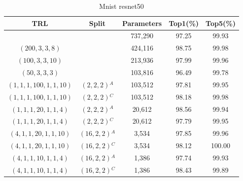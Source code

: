 \documentclass{article}
\begin{document}
	
	
	\begin{table}
		\centering
		\begin{tabular}{c c c c c}
			\hline
			\textbf{TRL} & \textbf{Split} & \textbf{Parameters} & \textbf{Top1(\%)} & \textbf{Top5(\%)} \\
			\hline
			& & 737,290 & 97.25 & 99.93 \\
			$(200,3,3,8)$ & & 424,116 & 98.75 & 99.98 \\
			$(100,3,3,10)$ & & 213,936 & 97.99 & 99.96 \\
			$(50,3,3,3)$ & & 103,816 & 96.49 & 99.78 \\
			$(1,1,1,100,1,1,10)$ & $(2,2,2)$$^A$ & 103,512 & 97.81 & 99.95 \\
			$(1,1,1,100,1,1,10)$ & $(2,2,2)$$^C$ & 103,512 & 98.18 & 99.98 \\
			$(1,1,1,20,1,1,4)$ & $(2,2,2)$$^A$ & 20,612 & 98.56 & 99.94 \\
			$(1,1,1,20,1,1,4)$ & $(2,2,2)$$^C$ & 20,612 & 97.79 & 99.95 \\
			$(4,1,1,20,1,1,10)$ & $(16,2,2)$$^A$ & 3,534 & 97.85 & 99.96 \\
			$(4,1,1,20,1,1,10)$ & $(16,2,2)$$^C$ & 3,534 & 98.12 & 100.00 \\
			$(4,1,1,10,1,1,4)$ & $(16,2,2)$$^A$ & 1,386 & 97.74 & 99.93 \\
			$(4,1,1,10,1,1,4)$ & $(16,2,2)$$^C$ & 1,386 & 98.43 & 99.89 \\
			\hline
		\end{tabular}
		\caption{Mnist resnet50}
		\label{tab: mnist resnet50}
	\end{table}
	
	
	
	
	
\end{document}
